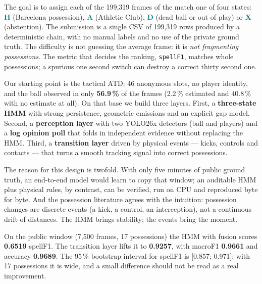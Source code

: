 \documentclass[10pt,a4paper]{article}
\newcommand{\good}[1]{\textcolor{teal}{\bfseries #1}}
\begin{document}
The goal is to assign each of the 199,319 frames of the match one of four states:
\good{H} (Barcelona possession), \good{A} (Athletic Club), \good{D} (dead ball or out of
play) or \good{X} (abstention). The submission is a single CSV of 199,319 rows produced by a
deterministic chain, with no manual labels and no use of the private ground truth. The
difficulty is not guessing the average frame: it is \emph{not fragmenting possessions}. The
metric that decides the ranking, \texttt{spellF1}, matches whole possessions; a spurious one
second switch can destroy a correct thirty second one.

Our starting point is the tactical ATD: 46 anonymous slots, no player identity, and the ball
observed in only \textbf{56.9\,\%} of the frames (2.2\,\% estimated and 40.8\,\% with no
estimate at all). On that base we build three layers. First, a \textbf{three-state HMM} with
strong persistence, geometric emissions and an explicit gap model. Second, a
\textbf{perception layer} with two YOLO26x detectors (ball and players) and a \textbf{log
opinion poll} that folds in independent evidence without replacing the HMM. Third, a
\textbf{transition layer} driven by physical events --- kicks, controls and contacts --- that
turns a smooth tracking signal into correct possessions.

The reason for this design is twofold. With only five minutes of public ground truth, an
end-to-end model would learn to copy that window; an auditable HMM plus physical rules, by
contrast, can be verified, run on CPU and reproduced byte for byte. And the possession
literature agrees with the intuition: possession changes are discrete events (a kick, a
control, an interception), not a continuous drift of distances. The HMM brings stability; the
events bring the moment.

On the public window (7,500 frames, 17 possessions) the HMM with fusion scores
\textbf{0.6519} spellF1. The transition layer lifts it to \textbf{0.9257}, with macroF1
\textbf{0.9661} and accuracy \textbf{0.9689}. The 95\,\% bootstrap interval for spellF1 is
[0.857; 0.971]: with 17 possessions it is wide, and a small difference should not be read as
a real improvement.
\end{document}

